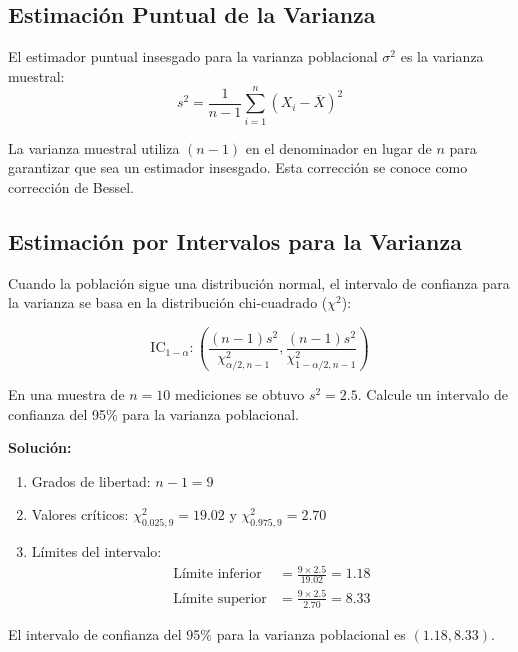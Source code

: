 \subsection{Estimación Puntual de la Varianza}

\begin{definition}
El estimador puntual insesgado para la varianza poblacional $\sigma^2$ es la varianza muestral:
\[
s^2 = \frac{1}{n-1} \sum_{i=1}^n (X_i - \overline{X})^2
\]
\end{definition}

\begin{remark}
La varianza muestral utiliza $(n-1)$ en el denominador en lugar de $n$ para garantizar que sea un estimador insesgado. Esta corrección se conoce como corrección de Bessel.
\end{remark}

\subsection{Estimación por Intervalos para la Varianza}

Cuando la población sigue una distribución normal, el intervalo de confianza para la varianza se basa en la distribución chi-cuadrado ($\chi^2$):

\[
\text{IC}_{1-\alpha}: \left( \frac{(n-1)s^2}{\chi^2_{\alpha/2, n-1}}, \frac{(n-1)s^2}{\chi^2_{1-\alpha/2, n-1}} \right)
\]

\begin{example}
En una muestra de $n=10$ mediciones se obtuvo $s^2 = 2.5$. Calcule un intervalo de confianza del 95\% para la varianza poblacional.

\textbf{Solución:}
\begin{enumerate}
\item Grados de libertad: $n-1 = 9$
\item Valores críticos: $\chi^2_{0.025,9} = 19.02$ y $\chi^2_{0.975,9} = 2.70$
\item Límites del intervalo:
   \begin{align}
   \text{Límite inferior} &= \frac{9 \times 2.5}{19.02} = 1.18\\
   \text{Límite superior} &= \frac{9 \times 2.5}{2.70} = 8.33
   \end{align}
\end{enumerate}

El intervalo de confianza del 95\% para la varianza poblacional es $(1.18, 8.33)$.
\end{example}

